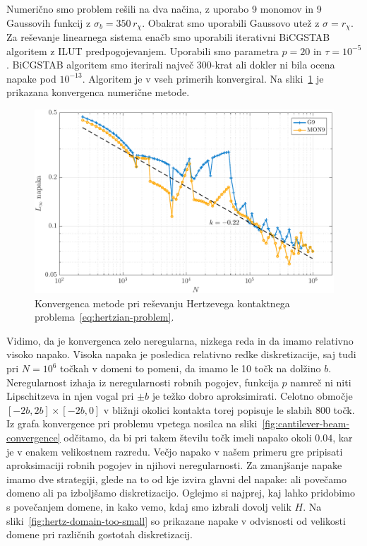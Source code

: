 \documentclass[12pt,a4paper,twoside]{article}
\theoremstyle{definition} %
\theoremstyle{plain} %
\numberwithin{equation}{section}
\newlength{\iw}
\begin{document}
Numerično smo problem rešili na dva načina, z uporabo 9 monomov in 9 Gaussovih funkcij z $\sigma_b =
350\,r_\chi$. Obakrat smo uporabili Gaussovo utež z $\sigma = r_\chi$. Za reševanje linearnega
sistema enačb smo uporabili iterativni BiCGSTAB algoritem z ILUT predpogojevanjem. Uporabili smo
parametra $p=20$ in $\tau = 10^{-5}$. BiCGSTAB algoritem smo iterirali največ 300-krat ali dokler ni
bila ocena napake pod $10^{-13}$. Algoritem je v vseh primerih konvergiral. Na
sliki~\ref{fig:hertz-convergence} je prikazana konvergenca numerične metode.

\begin{figure}[!h]
  \centering
  \includegraphics[width=\iw]{images/hertzian_convergence.pdf}
  \caption[Konvergenca metode pri reševanju Hertzevega kontaktnega
  problema.]{Konvergenca metode pri reševanju Hertzevega kontaktnega
  problema~\eqref{eq:hertzian-problem}.}
  \label{fig:hertz-convergence}
\end{figure}

Vidimo, da je konvergenca zelo neregularna, nizkega reda in da imamo relativno visoko napako.
Visoka napaka je posledica relativno redke diskretizacije, saj tudi pri $N = 10^6$ točkah v domeni
to pomeni, da imamo le 10 točk na dolžino $b$. Neregularnost izhaja iz neregularnosti robnih
pogojev, funkcija $p$ namreč ni niti Lipschitzeva in njen vogal pri $\pm b$ je težko dobro
aproksimirati. Celotno območje $[-2b, 2b] \times [-2b, 0]$ v bližnji okolici kontakta torej popisuje
le slabih 800 točk. Iz grafa konvergence pri problemu vpetega nosilca na
sliki~\ref{fig:cantilever-beam-convergence} odčitamo, da bi pri takem številu točk imeli napako
okoli $0.04$, kar je v enakem velikostnem razredu. Večjo napako v našem primeru gre pripisati
aproksimaciji robnih pogojev in njihovi neregularnosti. Za zmanjšanje napake imamo dve strategiji,
glede na to od kje izvira glavni del napake: ali povečamo domeno ali pa izboljšamo diskretizacijo.
Oglejmo si najprej, kaj lahko pridobimo s povečanjem domene, in kako vemo, kdaj smo izbrali dovolj
velik $H$. Na sliki~\ref{fig:hertz-domain-too-small} so prikazane napake v odvisnosti od velikosti
domene pri različnih gostotah diskretizacij.
\end{document}
